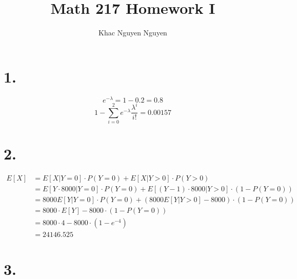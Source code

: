 \documentclass[11pt]{article}
\title{\textbf{Math 217 Homework I}}
\author{Khac Nguyen Nguyen}
\date{}
\begin{document}
\section*{1.}
\[
    e^{-\lambda} = 1-0.2 = 0.8    
\]
\[
    1 - \sum_{i=0}^2 e^{-\lambda} \frac{\lambda^i}{i!} = 0.00157
\]
\pagebreak
\section*{2.}
\begin{equation*}
    \begin{aligned}
        E[X] 
        &= E[X|Y=0] \cdot P(Y=0) + E[X|Y>0] \cdot P(Y>0)  \\
        &= E[Y\cdot 8000|Y=0] \cdot P(Y=0) + E[(Y-1)\cdot 8000|Y>0] \cdot (1-P(Y=0)) \\
        &= 8000 E[Y|Y=0] \cdot P(Y=0) + (8000 E[Y|Y>0] - 8000) \cdot (1-P(Y=0)) \\
        &= 8000 \cdot E[Y] - 8000 \cdot (1-P(Y=0)) \\
        &= 8000 \cdot 4 -8000\cdot (1-e^{-4}) \\
        &= 24146.525
    \end{aligned}
\end{equation*}
\pagebreak
\section*{3.}
\end{document}
